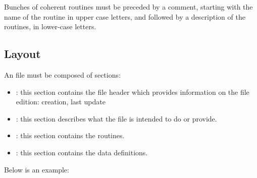 Bunches of coherent routines must be preceded by a comment, starting with
the name of the routine in upper case letters, and followed by a description
of the routines, in lower-case letters.

%
%

\subsection{Layout}

An  file must be composed of sections:

\begin{itemize}
  \item
    : this section contains the file header which provides
    information on the file edition: creation, last update \etc{}
  \item
    : this section describes what the file is intended
    to do or provide.
  \item
    : this section contains the  routines.
  \item
    : this section contains the data definitions.
\end{itemize}

Below is an example:

